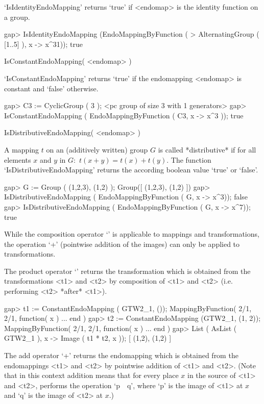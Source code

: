 `IsIdentityEndoMapping' returns `true' if <endomap> is the identity
function on a group.

\beginexample
    gap> IsIdentityEndoMapping (EndoMappingByFunction ( 
    > AlternatingGroup ( [1..5] ), x -> x^31));
    true
\endexample

\>IsConstantEndoMapping( <endomap> )

`IsConstantEndoMapping' returns `true' if the endomapping
<endomap> is constant and `false' otherwise.

\beginexample
    gap> C3 := CyclicGroup ( 3 );
    <pc group of size 3 with 1 generators>
    gap> IsConstantEndoMapping ( EndoMappingByFunction ( C3,  x -> x^3 ));
    true
\endexample

\>IsDistributiveEndoMapping( <endomap> )

A mapping $t$ on an (additively written) group $G$ is called
*distributive* if for all elements $x$ and $y$ in $G$:\
$t(x+y) = t(x) + t(y)$.
The function `IsDistributiveEndoMapping' returns the according
boolean value `true' or `false'.

\beginexample
    gap> G := Group ( (1,2,3), (1,2) );
    Group([ (1,2,3), (1,2) ])
    gap> IsDistributiveEndoMapping ( EndoMappingByFunction ( G, x -> x^3));
    false
    gap> IsDistributiveEndoMapping ( EndoMappingByFunction ( G, x -> x^7));
    true
\endexample

\Section{Operations for endo mappings}


While the composition operator `\*' is applicable to mappings and
transformations, the operation `+' (pointwise addition of the images) can
only be applied to transformations.

The product operator `\*' returns the transformation which is obtained 
from the transformations <t1> and <t2> by composition of <t1> and <t2>
(i.e. performing <t2> *after* <t1>).

\beginexample
    gap> t1 := ConstantEndoMapping ( GTW2_1, ());
    MappingByFunction( 2/1, 2/1, function( x ) ... end )
    gap> t2 := ConstantEndoMapping (GTW2_1, (1, 2));
    MappingByFunction( 2/1, 2/1, function( x ) ... end )
    gap> List ( AsList ( GTW2_1 ), x -> Image ( t1 * t2, x ));
    [ (1,2), (1,2) ]
\endexample

The add operator `+' returns the endomapping which is obtained 
from the endomappings <t1> and <t2> by pointwise addition 
of <t1> and <t2>. (Note that in this context addition means that
for every place $x$ in the source of <t1> and <t2>,   
{\GAP} performs the  operation `p\ \*\ q', where
`p' is the image of <t1> at $x$ and `q' is the image of <t2> at $x$.) 

